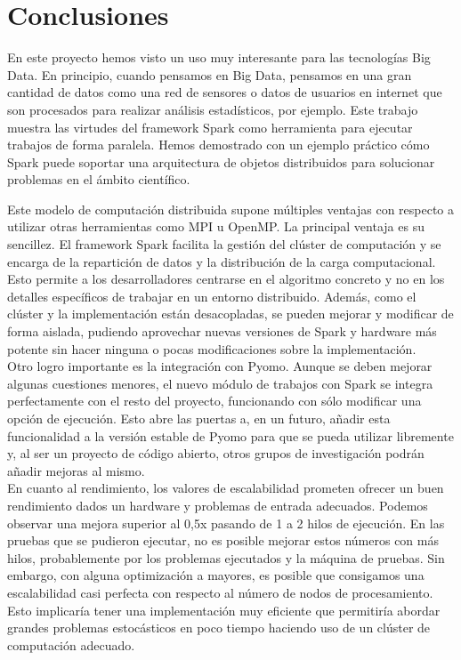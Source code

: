 \chapter{Conclusiones}
\label{ch:conclusiones}

En este proyecto hemos visto un uso muy interesante para las tecnologías Big Data. En principio, cuando pensamos en Big Data, pensamos en una gran cantidad de datos como una red de sensores o datos de usuarios en internet que son procesados para realizar análisis estadísticos, por ejemplo. Este trabajo muestra las virtudes del framework Spark como herramienta para ejecutar trabajos de forma paralela. Hemos demostrado con un ejemplo práctico cómo Spark puede soportar una arquitectura de objetos distribuidos para solucionar problemas en el ámbito científico. 

Este modelo de computación distribuida supone múltiples ventajas con respecto a utilizar otras herramientas como MPI u OpenMP. La principal ventaja es su sencillez. El framework Spark facilita la gestión del clúster de computación y se encarga de la repartición de datos y la distribución de la carga computacional. Esto permite a los desarrolladores centrarse en el algoritmo concreto y no en los detalles específicos de trabajar en un entorno distribuido. Además, como el clúster y la implementación están desacopladas, se pueden mejorar y modificar de forma aislada, pudiendo aprovechar nuevas versiones de Spark y hardware más potente sin hacer ninguna o pocas modificaciones sobre la implementación.\\

Otro logro importante es la integración con Pyomo. Aunque se deben mejorar algunas cuestiones menores, el nuevo módulo de trabajos con Spark se integra perfectamente con el resto del proyecto, funcionando con sólo modificar una opción de ejecución. Esto abre las puertas a, en un futuro, añadir esta funcionalidad a la versión estable de Pyomo para que se pueda utilizar libremente y, al ser un proyecto de código abierto, otros grupos de investigación podrán añadir mejoras al mismo.\\

En cuanto al rendimiento, los valores de escalabilidad prometen ofrecer un buen rendimiento dados un hardware y problemas de entrada adecuados. Podemos observar una mejora superior al 0,5x pasando de 1 a 2 hilos de ejecución. En las pruebas que se pudieron ejecutar, no es posible mejorar estos números con más hilos, probablemente por los problemas ejecutados y la máquina de pruebas. Sin embargo, con alguna optimización a mayores, es posible que consigamos una escalabilidad casi perfecta con respecto al número de nodos de procesamiento. Esto implicaría tener una implementación muy eficiente que permitiría abordar grandes problemas estocásticos en poco tiempo haciendo uso de un clúster de computación adecuado.

